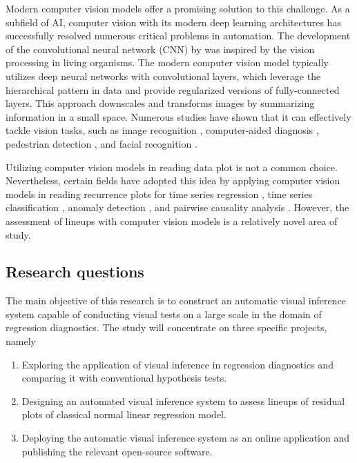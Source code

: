 \documentclass[11pt,a4paper,]{article}
\providecommand{\tightlist}{%
  \setlength{\itemsep}{0pt}\setlength{\parskip}{0pt}}
\begin{document}
Modern computer vision models offer a promising solution to this challenge. As a subfield of AI, computer vision with its modern deep learning architectures has successfully resolved numerous critical problems in automation. The development of the convolutional neural network (CNN) by \textcite{fukushima_neocognitron_1982} was inspired by the vision processing in living organisms. The modern computer vision model typically utilizes deep neural networks with convolutional layers, which leverage the hierarchical pattern in data and provide regularized versions of fully-connected layers. This approach downscales and transforms images by summarizing information in a small space. Numerous studies have shown that it can effectively tackle vision tasks, such as image recognition \autocite{rawat_deep_2017}, computer-aided diagnosis \autocite{lee_image_2015}, pedestrian detection \autocite{brunetti_computer_2018}, and facial recognition \autocite{emami_facial_2012}.

Utilizing computer vision models in reading data plot is not a common choice. Nevertheless, certain fields have adopted this idea by applying computer vision models in reading recurrence plots for time series regression \autocite{ojeda_multivariate_2020}, time series classification \autocite{chu_automatic_2019,hailesilassie_financial_2019,hatami_classification_2018,zhang_encoding_2020}, anomaly detection \autocite{chen_convolutional_2020}, and pairwise causality analysis \autocite{singh_deep_2017}. However, the assessment of lineups with computer vision models is a relatively novel area of study.

\hypertarget{research-questions}{%
\subsection{Research questions}\label{research-questions}}

The main objective of this research is to construct an automatic visual inference system capable of conducting visual tests on a large scale in the domain of regression diagnostics. The study will concentrate on three specific projects, namely

\begin{enumerate}
\def\labelenumi{\arabic{enumi}.}
\tightlist
\item
  Exploring the application of visual inference in regression diagnostics and comparing it with conventional hypothesis tests.
\item
  Designing an automated visual inference system to assess lineups of residual plots of classical normal linear regression model.
\item
  Deploying the automatic visual inference system as an online application and publishing the relevant open-source software.
\end{enumerate}
\end{document}
